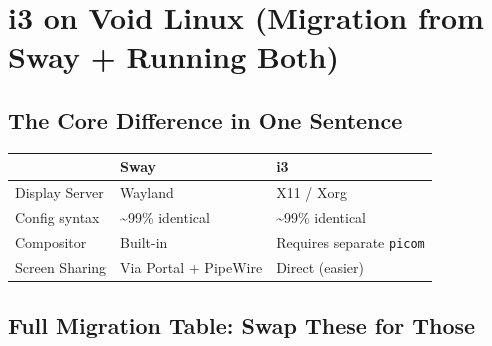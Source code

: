 \documentclass[12pt, a4paper]{book}
\begin{document}
\chapter{i3 on Void Linux (Migration from Sway + Running Both)}

\section{The Core Difference in One Sentence}

\begin{center}
\begin{tabularx}{0.85\textwidth}{lLL}
\toprule
 & \textbf{Sway} & \textbf{i3} \\
\midrule
Display Server & Wayland & X11 / Xorg \\
Config syntax  & \textasciitilde99\% identical & \textasciitilde99\% identical \\
Compositor     & Built-in & Requires separate \texttt{picom} \\
Screen Sharing & Via Portal + PipeWire & Direct (easier) \\
\bottomrule
\end{tabularx}
\end{center}

\section{Full Migration Table: Swap These for Those}
\end{document}
